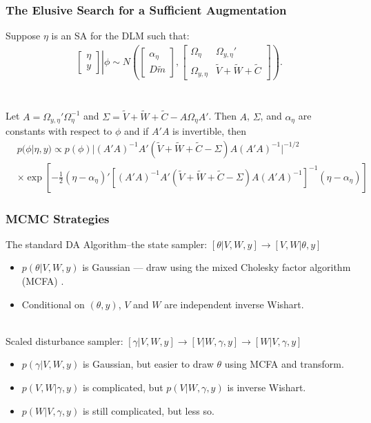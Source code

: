 \documentclass[xcolor=dvipsnames]{beamer}
\begin{document}
\begin{frame}
\frametitle{The Elusive Search for a Sufficient Augmentation}
Suppose $\eta$ is an SA for the DLM such that:\\
\begin{align*}
 \left. \begin{bmatrix}\eta \\ y \end{bmatrix}\right|\phi \sim N\left(\begin{bmatrix} \alpha_\eta \\ D\tilde{m} \end{bmatrix}, \begin{bmatrix}
   \Omega_\eta & \Omega_{y,\eta}' \\
   \Omega_{y,\eta} & \tilde{V} + \tilde{W} + \tilde{C} \end{bmatrix}\right).
\end{align*}\\~\\
Let $A=\Omega_{y,\eta}'\Omega_{\eta}^{-1}$ and $\Sigma = \tilde{V} + \tilde{W} + \tilde{C} - A\Omega_{\eta}A'$. Then $A$, $\Sigma$, and $\alpha_{\eta}$ are constants with respect to $\phi$ and if $A'A$ is invertible, then\\
\begin{align*}
&p(\phi|\eta,y) \propto p(\phi)|(A'A)^{-1}A'(\tilde{V} + \tilde{W} + \tilde{C} - \Sigma)A(A'A)^{-1}|^{-1/2}\\
&\times \exp\left[-\frac{1}{2}(\eta - \alpha_{\eta})'[(A'A)^{-1}A'(\tilde{V} + \tilde{W} + \tilde{C} - \Sigma)A(A'A)^{-1}]^{-1}(\eta - \alpha_{\eta})\right]
\end{align*}
\end{frame}

\begin{frame}
\frametitle{MCMC Strategies}
The standard DA Algorithm--the state sampler: {\color{blue}$[\theta|V,W,y] \to [V,W|\theta,y]$}
\begin{itemize}
\item $p(\theta|V,W,y)$ is Gaussian --- draw using the mixed Cholesky factor algorithm (MCFA) \citep{mccausland2011simulation}.
\item Conditional on $(\theta,y)$, $V$ and $W$ are independent inverse Wishart.\\~\\
\end{itemize}

Scaled disturbance sampler: {\color{blue}$[\gamma|V,W,y] \to [V|W,\gamma,y] \to [W|V,\gamma,y]$}
\begin{itemize}
\item $p(\gamma|V,W,y)$ is Gaussian, but easier to draw $\theta$ using MCFA and transform.
\item $p(V,W|\gamma,y)$ is complicated, but $p(V|W,\gamma,y)$ is inverse Wishart.
\item $p(W|V,\gamma,y)$ is still complicated, but less so.
\end{itemize}
\end{frame}
\end{document}

